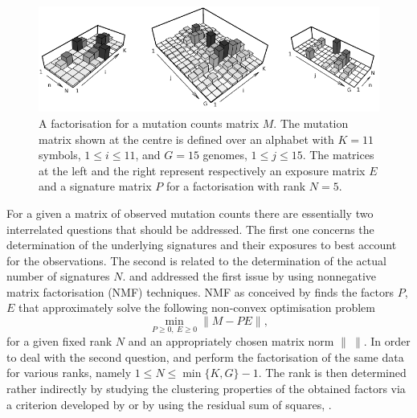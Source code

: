 \documentclass{bioinfo}
\begin{document}
\begin{figure}
 \centering\includegraphics[width=14cm]{figs/f_bw_t}
 \caption{\textrm{%
  A factorisation for a mutation counts matrix $M$. The
  mutation matrix shown at the centre is defined over an alphabet with
  $K=11$ symbols, $1 \leqslant i \leqslant 11$, and $G=15$ genomes,
  $1\leqslant j\leqslant 15$. The matrices at the left and the right 
  represent respectively an exposure  matrix $E$ and a signature matrix
  $P$ for a factorisation with rank $N=5$.
  }
 }
\label{fig:toyNMF}
\end{figure}

For a given a matrix of observed mutation counts there are essentially
two interrelated questions that should be addressed. The first one
concerns the determination of the underlying signatures and their
exposures to best account for the observations. The second is related
to the determination of the actual number of signatures
$N$. \cite{NCell} and \cite{A} addressed the first issue by using
nonnegative matrix factorisation (NMF) techniques.  NMF as conceived
by \cite{LS} finds the factors $P$, $E$ that approximately solve the
following non-convex optimisation problem
\begin{equation}
 \label{eqn:NMF}
  \min_{P\geqslant 0,\ E\geqslant 0}\|M - PE\|,
\end{equation}
for a given fixed rank $N$ and an appropriately chosen matrix norm
$\|\ \|$.  In order to deal with the second question, \cite{NCell} and
\cite{A} perform the factorisation of the same data for various ranks,
namely $1 \leq N \leq \min\{K, G\}-1$. The rank is then
determined rather indirectly by studying the clustering properties of
the obtained factors via a criterion developed by \cite{BTGM} or by 
using the residual sum of squares, \cite{HMSG}.
\end{document}
